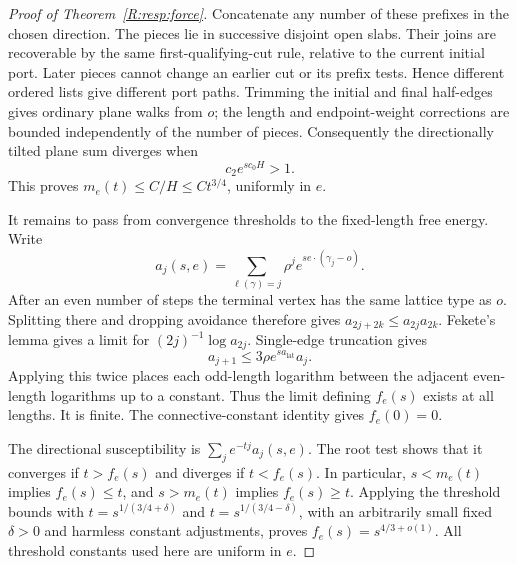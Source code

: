 \begin{proof}[Proof of Theorem~\ref{R:resp:force}]
Concatenate any number of these prefixes in the chosen direction. The pieces lie in successive disjoint open slabs. Their joins are recoverable by the same first-qualifying-cut rule, relative to the current initial port. Later pieces cannot change an earlier cut or its prefix tests. Hence different ordered lists give different port paths. Trimming the initial and final half-edges gives ordinary plane walks from $o$; the length and endpoint-weight corrections are bounded independently of the number of pieces. Consequently the directionally tilted plane sum diverges when
\[
 c_2e^{s c_0H}>1.
\]
This proves $m_e(t)\le C/H\le Ct^{3/4}$, uniformly in $e$.

It remains to pass from convergence thresholds to the fixed-length free energy. Write
\[
 a_j(s,e)=\sum_{\ell(\gamma)=j}\rho^j
             e^{s e\cdot(\gamma_j-o)}.
\]
After an even number of steps the terminal vertex has the same lattice type as $o$. Splitting there and dropping avoidance therefore gives
$a_{2j+2k}\le a_{2j}a_{2k}$. Fekete's lemma gives a limit for $(2j)^{-1}\log a_{2j}$. Single-edge truncation gives
\[
 a_{j+1}\le 3\rho e^{s a_{\mathrm{lat}}}a_j.
\]
Applying this twice places each odd-length logarithm between the adjacent even-length logarithms up to a constant. Thus the limit defining $f_e(s)$ exists at all lengths. It is finite. The connective-constant identity gives $f_e(0)=0$.

The directional susceptibility is $\sum_j e^{-tj}a_j(s,e)$. The root test shows that it converges if $t>f_e(s)$ and diverges if $t<f_e(s)$. In particular, $s<m_e(t)$ implies $f_e(s)\le t$, and $s>m_e(t)$ implies $f_e(s)\ge t$. Applying the threshold bounds with $t=s^{1/(3/4+\delta)}$ and $t=s^{1/(3/4-\delta)}$, with an arbitrarily small fixed $\delta>0$ and harmless constant adjustments, proves $f_e(s)=s^{4/3+o(1)}$. All threshold constants used here are uniform in $e$.
\end{proof}

